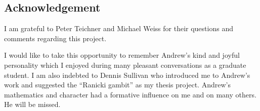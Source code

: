 
\subsection*{Acknowledgement}

I am grateful to Peter Teichner and Michael Weiss for their questions and comments regarding this project.

I would like to take this opportunity to remember Andrew's kind and joyful personality which I enjoyed during many pleasant conversations as a graduate student.
I am also indebted to Dennis Sullivan who introduced me to Andrew's work and suggested the ``Ranicki gambit'' as my thesis project.
Andrew's mathematics and character had a formative influence on me and on many others.
He will be missed.